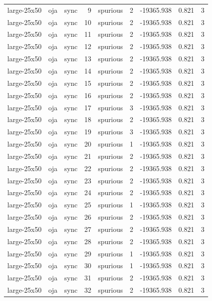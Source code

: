 \begin{tabular}{lllrlrrrr}
large-25x50 & oja & sync & 9 & spurious & 2 & -19365.938 & 0.821 & 3 \\
large-25x50 & oja & sync & 10 & spurious & 2 & -19365.938 & 0.821 & 3 \\
large-25x50 & oja & sync & 11 & spurious & 2 & -19365.938 & 0.821 & 3 \\
large-25x50 & oja & sync & 12 & spurious & 2 & -19365.938 & 0.821 & 3 \\
large-25x50 & oja & sync & 13 & spurious & 2 & -19365.938 & 0.821 & 3 \\
large-25x50 & oja & sync & 14 & spurious & 2 & -19365.938 & 0.821 & 3 \\
large-25x50 & oja & sync & 15 & spurious & 2 & -19365.938 & 0.821 & 3 \\
large-25x50 & oja & sync & 16 & spurious & 2 & -19365.938 & 0.821 & 3 \\
large-25x50 & oja & sync & 17 & spurious & 3 & -19365.938 & 0.821 & 3 \\
large-25x50 & oja & sync & 18 & spurious & 2 & -19365.938 & 0.821 & 3 \\
large-25x50 & oja & sync & 19 & spurious & 3 & -19365.938 & 0.821 & 3 \\
large-25x50 & oja & sync & 20 & spurious & 1 & -19365.938 & 0.821 & 3 \\
large-25x50 & oja & sync & 21 & spurious & 2 & -19365.938 & 0.821 & 3 \\
large-25x50 & oja & sync & 22 & spurious & 2 & -19365.938 & 0.821 & 3 \\
large-25x50 & oja & sync & 23 & spurious & 2 & -19365.938 & 0.821 & 3 \\
large-25x50 & oja & sync & 24 & spurious & 2 & -19365.938 & 0.821 & 3 \\
large-25x50 & oja & sync & 25 & spurious & 1 & -19365.938 & 0.821 & 3 \\
large-25x50 & oja & sync & 26 & spurious & 2 & -19365.938 & 0.821 & 3 \\
large-25x50 & oja & sync & 27 & spurious & 2 & -19365.938 & 0.821 & 3 \\
large-25x50 & oja & sync & 28 & spurious & 2 & -19365.938 & 0.821 & 3 \\
large-25x50 & oja & sync & 29 & spurious & 1 & -19365.938 & 0.821 & 3 \\
large-25x50 & oja & sync & 30 & spurious & 1 & -19365.938 & 0.821 & 3 \\
large-25x50 & oja & sync & 31 & spurious & 2 & -19365.938 & 0.821 & 3 \\
large-25x50 & oja & sync & 32 & spurious & 2 & -19365.938 & 0.821 & 3 \\

\end{tabular}
